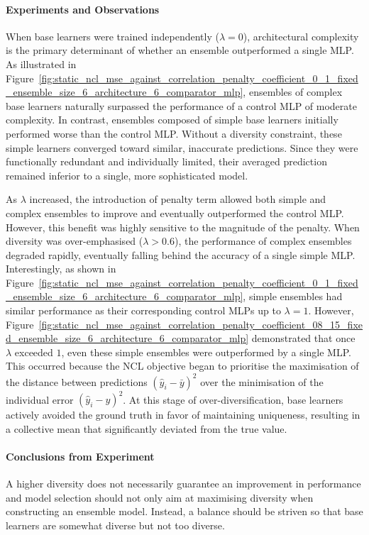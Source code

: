 \documentclass{article}
\begin{document}
\paragraph{Experiments and Observations}
When base learners were trained independently ($\lambda = 0$), architectural complexity is the primary determinant of whether an ensemble outperformed a single MLP. As illustrated in Figure~\ref{fig:static_ncl_mse_against_correlation_penalty_coefficient_0_1_fixed_ensemble_size_6_architecture_6_comparator_mlp}, ensembles of complex base learners naturally surpassed the performance of a control MLP of moderate complexity. In contrast, ensembles composed of simple base learners initially performed worse than the control MLP. Without a diversity constraint, these simple learners converged toward similar, inaccurate predictions. Since they were functionally redundant and individually limited, their averaged prediction remained inferior to a single, more sophisticated model. 

As $\lambda$ increased, the introduction of penalty term allowed both simple and complex ensembles to improve and eventually outperformed the control MLP. However, this benefit was highly sensitive to the magnitude of the penalty. When diversity was over-emphasised ($\lambda > 0.6$), the performance of complex ensembles degraded rapidly, eventually falling behind the accuracy of a single simple MLP. Interestingly, as shown in Figure~\ref{fig:static_ncl_mse_against_correlation_penalty_coefficient_0_1_fixed_ensemble_size_6_architecture_6_comparator_mlp}, simple ensembles had similar performance as their corresponding control MLPs up to $\lambda = 1$. However, Figure~\ref{fig:static_ncl_mse_against_correlation_penalty_coefficient_08_15_fixed_ensemble_size_6_architecture_6_comparator_mlp} demonstrated that once $\lambda$ exceeded $1$, even these simple ensembles were outperformed by a single MLP. This occurred because the NCL objective began to prioritise the maximisation of the distance between predictions $(\hat{y}_i - \bar{y})^2$ over the minimisation of the individual error $(\hat{y}_i - y)^2$. At this stage of over-diversification, base learners actively avoided the ground truth in favor of maintaining uniqueness, resulting in a collective mean that significantly deviated from the true value. 

\paragraph{Conclusions from Experiment}
A higher diversity does not necessarily guarantee an improvement in performance and model selection should not only aim at maximising diversity when constructing an ensemble model. Instead, a balance should be striven so that base learners are somewhat diverse but not too diverse. 
\end{document}
